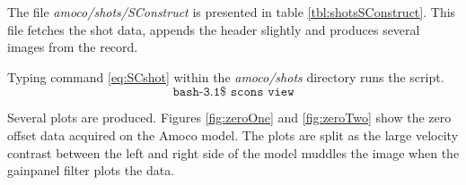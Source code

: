 The file \emph{amoco/shots/SConstruct} is presented in table \ref{tbl:shotsSConstruct}.  This file fetches the shot data, appends the header slightly and produces several images from the record.

{
\tiny

\normalsize
}

Typing command \ref{eq:SCshot} within the \emph{amoco\slash shots} directory runs the script.
\begin{equation}\label{eq:SCshot} \texttt{bash-3.1\$\ scons\ view} \end{equation}

Several plots are produced.  Figures \ref{fig:zeroOne} and \ref{fig:zeroTwo} show the zero offset data acquired on the Amoco model.  The plots are split as the large velocity contrast between the left and right side of the model muddles the image when the gainpanel filter plots the data.  

